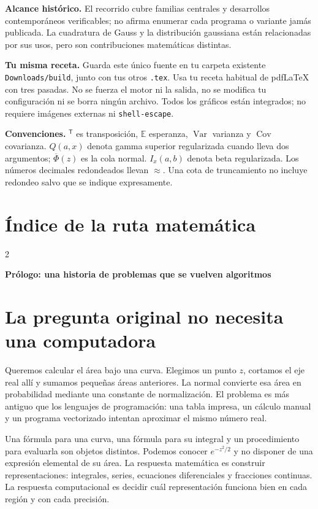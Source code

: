 \documentclass[11pt,a4paper]{article}
\newcommand{\E}{\mathbb E}
\newcommand{\T}{^{\mathsf T}}
\DeclareMathOperator{\Var}{Var}
\DeclareMathOperator{\Cov}{Cov}
\theoremstyle{definition}
\newcommand{\parte}[1]{\par\bigskip\Needspace{8\baselineskip}\begin{center}{\Large\bfseries\color{azul}#1}\end{center}}
\newcounter{problema}
\newcommand{\SF}{\overline\Phi}
\begin{document}
\textbf{Alcance histórico.} El recorrido cubre familias centrales y desarrollos contemporáneos verificables; no afirma enumerar cada programa o variante jamás publicada. La cuadratura de Gauss y la distribución gaussiana están relacionadas por sus usos, pero son contribuciones matemáticas distintas.

\textbf{Tu misma receta.} Guarda este único fuente en tu carpeta existente \texttt{Downloads/build}, junto con tus otros \texttt{.tex}. Usa tu receta habitual de pdfLaTeX con tres pasadas. No se fuerza el motor ni la salida, no se modifica tu configuración ni se borra ningún archivo. Todos los gráficos están integrados; no requiere imágenes externas ni \texttt{shell-escape}.

\textbf{Convenciones.} $\T$ es transposición, $\E$ esperanza, $\Var$ varianza y $\Cov$ covarianza. $Q(a,x)$ denota gamma superior regularizada cuando lleva dos argumentos; $\SF(z)$ es la cola normal. $I_x(a,b)$ denota beta regularizada. Los números decimales redondeados llevan $\approx$. Una cota de truncamiento no incluye redondeo salvo que se indique expresamente.

\setcounter{tocdepth}{1}
\section*{Índice de la ruta matemática}
\begin{multicols}{2}\footnotesize\setlength{\parskip}{0pt}
\makeatletter
\renewcommand*\l@section[2]{\@dottedtocline{1}{0pt}{2.5em}{#1}{#2}}
\makeatother
\end{multicols}


\parte{Prólogo: una historia de problemas que se vuelven algoritmos}
\section{La pregunta original no necesita una computadora}
Queremos calcular el área bajo una curva. Elegimos un punto $z$, cortamos el eje real allí y sumamos pequeñas áreas anteriores. La normal convierte esa área en probabilidad mediante una constante de normalización. El problema es más antiguo que los lenguajes de programación: una tabla impresa, un cálculo manual y un programa vectorizado intentan aproximar el mismo número real.

Una fórmula para una curva, una fórmula para su integral y un procedimiento para evaluarla son objetos distintos. Podemos conocer $e^{-z^2/2}$ y no disponer de una expresión elemental de su área. La respuesta matemática es construir representaciones: integrales, series, ecuaciones diferenciales y fracciones continuas. La respuesta computacional es decidir cuál representación funciona bien en cada región y con cada precisión.
\end{document}
